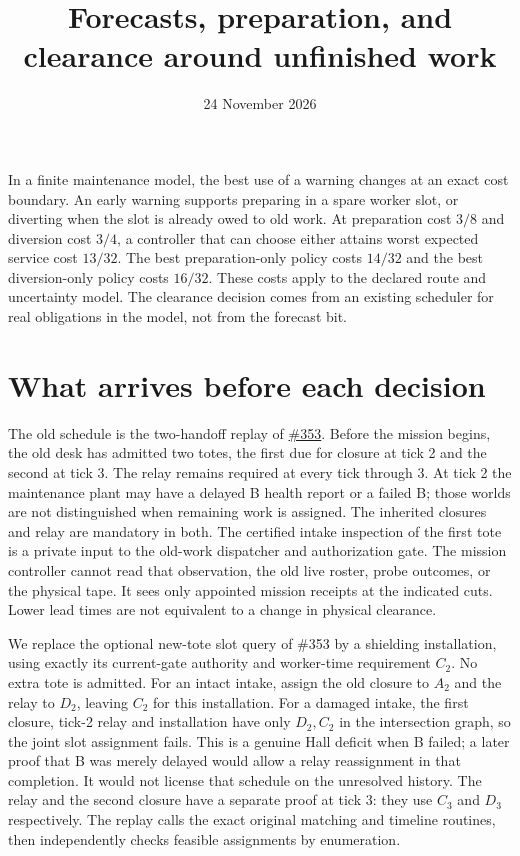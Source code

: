 \documentclass[11pt]{article}
\title{Forecasts, preparation, and clearance around unfinished work}
\date{24 November 2026}
\begin{document}
\maketitle

In a finite maintenance model, the best use of a warning changes at an exact cost boundary. An early warning supports preparing in a spare worker slot, or diverting when the slot is already owed to old work. At preparation cost $3/8$ and diversion cost $3/4$, a controller that can choose either attains worst expected service cost $13/32$. The best preparation-only policy costs $14/32$ and the best diversion-only policy costs $16/32$. These costs apply to the declared route and uncertainty model. The clearance decision comes from an existing scheduler for real obligations in the model, not from the forecast bit.

\section{What arrives before each decision}
The old schedule is the two-handoff replay of \href{https://github.com/eternal-november/eos-research-programmes/pull/353}{\#353}. Before the mission begins, the old desk has admitted two totes, the first due for closure at tick 2 and the second at tick 3. The relay remains required at every tick through 3. At tick 2 the maintenance plant may have a delayed B health report or a failed B; those worlds are not distinguished when remaining work is assigned. The inherited closures and relay are mandatory in both. The certified intake inspection of the first tote is a private input to the old-work dispatcher and authorization gate. The mission controller cannot read that observation, the old live roster, probe outcomes, or the physical tape. It sees only appointed mission receipts at the indicated cuts. Lower lead times are not equivalent to a change in physical clearance.

We replace the optional new-tote slot query of \#353 by a shielding installation, using exactly its current-gate authority and worker-time requirement $C_2$. No extra tote is admitted. For an intact intake, assign the old closure to $A_2$ and the relay to $D_2$, leaving $C_2$ for this installation. For a damaged intake, the first closure, tick-2 relay and installation have only $D_2,C_2$ in the intersection graph, so the joint slot assignment fails. This is a genuine Hall deficit when B failed; a later proof that B was merely delayed would allow a relay reassignment in that completion. It would not license that schedule on the unresolved history. The relay and the second closure have a separate proof at tick 3: they use $C_3$ and $D_3$ respectively. The replay calls the exact original matching and timeline routines, then independently checks feasible assignments by enumeration.
\end{document}
